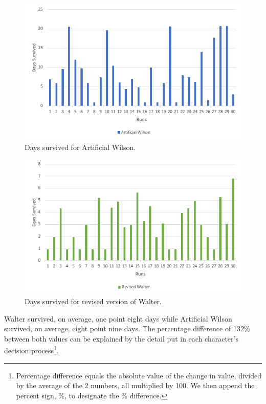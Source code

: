 \begin{figure}
  \centering
  \includegraphics[width=\textwidth]{./Images/days-survived-wilson}
  \caption{Days survived for Artificial Wilson.}
  \label{fig:days-survived-wilson}
\end{figure}

\begin{figure}
  \centering
  \includegraphics[width=\textwidth]{./Images/days-survived-walter-new-and-improved}
  \caption{Days survived for revised version of Walter.}
  \label{fig:days-survived-walter-new-and-improved}
\end{figure}

Walter survived, on average, one point eight days while Artificial Wilson survived, on average, eight point nine days.
The percentage difference of 132\% between both values can be explained by the detail put in each character's decision process\footnote{Percentage difference equals the absolute value of the change in value, divided by the average of the 2 numbers, all multiplied by 100. We then append the percent sign, \%, to designate the \% difference.}.

